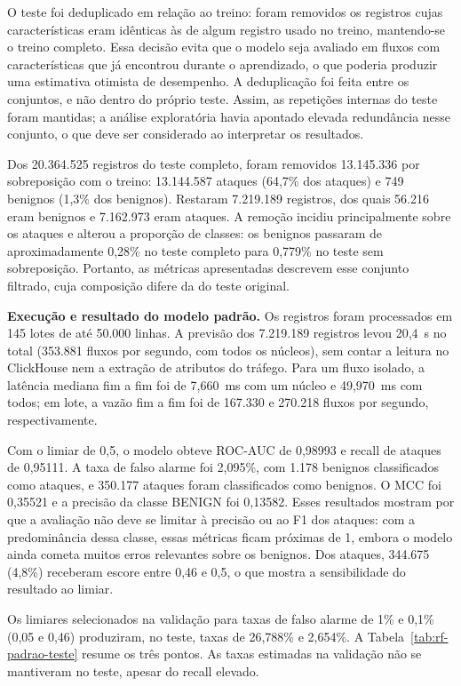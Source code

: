 \documentclass[
    12pt,                %
    openright,           %
    oneside,             %
    a4paper,             %
    english,             %
    brazil               %
]{abntex2}
\begin{document}
O teste foi deduplicado em relação ao treino: foram removidos os registros cujas características eram idênticas às de algum registro usado no treino, mantendo-se o treino completo. Essa decisão evita que o modelo seja avaliado em fluxos com características que já encontrou durante o aprendizado, o que poderia produzir uma estimativa otimista de desempenho. A deduplicação foi feita entre os conjuntos, e não dentro do próprio teste. Assim, as repetições internas do teste foram mantidas; a análise exploratória havia apontado elevada redundância nesse conjunto, o que deve ser considerado ao interpretar os resultados.

Dos 20.364.525 registros do teste completo, foram removidos 13.145.336 por sobreposição com o treino: 13.144.587 ataques (64,7\% dos ataques) e 749 benignos (1,3\% dos benignos). Restaram 7.219.189 registros, dos quais 56.216 eram benignos e 7.162.973 eram ataques. A remoção incidiu principalmente sobre os ataques e alterou a proporção de classes: os benignos passaram de aproximadamente 0,28\% no teste completo para 0,779\% no teste sem sobreposição. Portanto, as métricas apresentadas descrevem esse conjunto filtrado, cuja composição difere da do teste original.

\textbf{Execução e resultado do modelo padrão.} Os registros foram processados em 145 lotes de até 50.000 linhas. A previsão dos 7.219.189 registros levou 20,4~s no total (353.881 fluxos por segundo, com todos os núcleos), sem contar a leitura no ClickHouse nem a extração de atributos do tráfego. Para um fluxo isolado, a latência mediana fim a fim foi de 7,660~ms com um núcleo e 49,970~ms com todos; em lote, a vazão fim a fim foi de 167.330 e 270.218 fluxos por segundo, respectivamente.

Com o limiar de 0,5, o modelo obteve ROC-AUC de 0,98993 e recall de ataques de 0,95111. A taxa de falso alarme foi 2,095\%, com 1.178 benignos classificados como ataques, e 350.177 ataques foram classificados como benignos. O MCC foi 0,35521 e a precisão da classe BENIGN foi 0,13582. Esses resultados mostram por que a avaliação não deve se limitar à precisão ou ao F1 dos ataques: com a predominância dessa classe, essas métricas ficam próximas de 1, embora o modelo ainda cometa muitos erros relevantes sobre os benignos. Dos ataques, 344.675 (4,8\%) receberam escore entre 0,46 e 0,5, o que mostra a sensibilidade do resultado ao limiar.

Os limiares selecionados na validação para taxas de falso alarme de 1\% e 0,1\% (0,05 e 0,46) produziram, no teste, taxas de 26,788\% e 2,654\%. A Tabela~\ref{tab:rf-padrao-teste} resume os três pontos. As taxas estimadas na validação não se mantiveram no teste, apesar do recall elevado.
\end{document}
